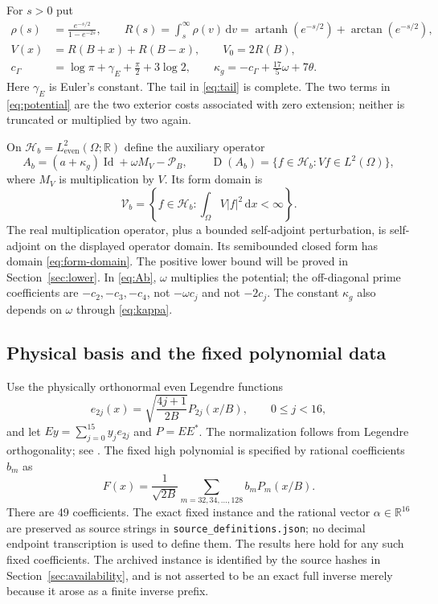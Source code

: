 \documentclass[11pt,a4paper]{article}
\newcommand{\R}{\mathbb R}
\newcommand{\HH}{\mathcal H}
\newcommand{\Id}{\operatorname{Id}}
\newcommand{\Dom}{\operatorname{D}}
\newcommand{\dd}{\,\mathrm dx}
\newcommand{\Pp}{\mathcal P_B}
\theoremstyle{remark}
\numberwithin{equation}{section}
\begin{document}
For $s>0$ put
\begin{align}
 \rho(s)&=\frac{e^{-s/2}}{1-e^{-2s}},\qquad
 R(s)=\int_s^\infty\rho(v)\,\mathrm dv
       =\operatorname{artanh}(e^{-s/2})+\arctan(e^{-s/2}),\label{eq:tail}\\
 V(x)&=R(B+x)+R(B-x),\qquad V_0=2R(B),\label{eq:potential}\\
 c_\Gamma&=\log\pi+\gamma_E+\frac\pi2+3\log2,\qquad
 \kappa_g=-c_\Gamma+\frac{17}{5}\omega+7\theta.\label{eq:kappa}
\end{align}
Here $\gamma_E$ is Euler's constant. The tail in \eqref{eq:tail} is complete.
The two terms in \eqref{eq:potential} are the two exterior costs associated
with zero extension; neither is truncated or multiplied by two again.

On $\HH_b=L^2_{\mathrm{even}}(\Omega;\R)$ define the auxiliary operator
\begin{equation}\label{eq:Ab}
 A_b=(a+\kappa_g)\Id+\omega M_V-\Pp,\qquad
 \Dom(A_b)=\{f\in\HH_b:Vf\in L^2(\Omega)\},
\end{equation}
where $M_V$ is multiplication by $V$. Its form domain is
\begin{equation}\label{eq:form-domain}
 \mathcal V_b=\left\{f\in\HH_b:\int_\Omega V|f|^2\dd<\infty\right\}.
\end{equation}
The real multiplication operator, plus a bounded self-adjoint perturbation,
is self-adjoint on the displayed operator domain. Its semibounded closed
form has domain \eqref{eq:form-domain}. The positive lower bound will be
proved in Section~\ref{sec:lower}. In \eqref{eq:Ab}, $\omega$ multiplies
the potential; the off-diagonal prime coefficients are $-c_2,-c_3,-c_4$,
not $-\omega c_j$ and not $-2c_j$. The constant $\kappa_g$ also depends on
$\omega$ through \eqref{eq:kappa}.

\subsection{Physical basis and the fixed polynomial data}
Use the physically orthonormal even Legendre functions
\begin{equation}\label{eq:basis}
 e_{2j}(x)=\sqrt{\frac{4j+1}{2B}}P_{2j}(x/B),\qquad0\le j<16,
\end{equation}
and let $Ey=\sum_{j=0}^{15}y_j e_{2j}$ and $P=EE^*$. The normalization
follows from Legendre orthogonality; see \cite[Section 18.3]{dlmf}.
The fixed high polynomial is specified by rational coefficients $b_m$ as
\begin{equation}\label{eq:F}
 F(x)=\frac1{\sqrt{2B}}\sum_{m=32,34,\ldots,128}b_m P_m(x/B).
\end{equation}
There are 49 coefficients. The exact fixed instance and the rational vector
$\alpha\in\R^{16}$ are preserved as source strings in
\nolinkurl{source_definitions.json}; no decimal endpoint transcription is
used to define them. The results here hold for any such fixed coefficients.
The archived instance is identified by the source hashes in
Section~\ref{sec:availability}, and is not asserted to be an exact full
inverse merely because it arose as a finite inverse prefix.
\end{document}
